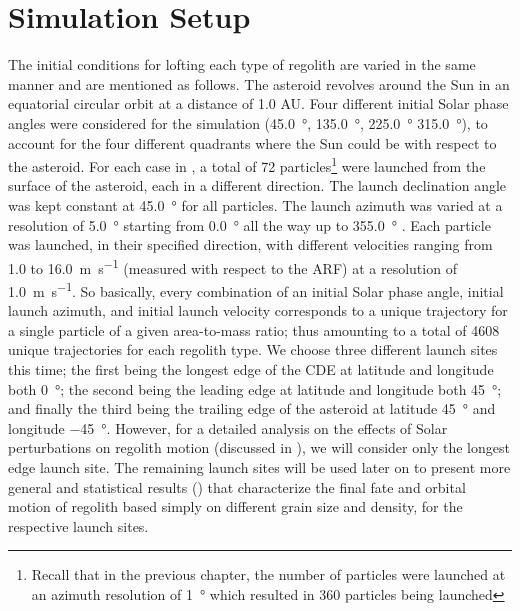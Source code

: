 \section{Simulation Setup}
\label{sec:simulation_setup}
The initial conditions for lofting each type of regolith are varied in the same manner and are mentioned as follows. The asteroid revolves around the Sun in an equatorial circular orbit at a distance of 1.0 AU. Four different initial Solar phase angles were considered for the simulation (\SI{45.0}{\degree}, \SI{135.0}{\degree}, \SI{225.0}{\degree} \SI{315.0}{\degree}), to account for the four different quadrants where the Sun could be with respect to the asteroid.
%
\newline\newline
%
For each case in , a total of 72 particles\footnote{Recall that in the previous chapter, the number of particles were launched at an azimuth resolution of \SI{1}{\degree} which resulted in 360 particles being launched} were launched from the surface of the asteroid, each in a different direction. The launch declination angle was kept constant at \SI{45.0}{\degree}  for all particles. The launch azimuth was varied at a resolution of \SI{5.0}{\degree}  starting from \SI{0.0}{\degree}  all the way up to \SI{355.0}{\degree} . Each particle was launched, in their specified direction, with different velocities ranging from 1.0 to \SI{16.0}{\metre\per\second} (measured with respect to the \gls{ARF}) at a resolution of \SI{1.0}{\metre\per\second}. So basically, every combination of an initial Solar phase angle, initial launch azimuth, and initial launch velocity corresponds to a unique trajectory for a single particle of a given area-to-mass ratio; thus amounting to a total of 4608 unique trajectories for each regolith type.
%
\newline\newline
%
We choose three different launch sites this time; the first being the longest edge of the \gls{CDE} at latitude and longitude both \SI{0}{\degree}; the second being the leading edge at latitude and longitude both \SI{45}{\degree}; and finally the third being the trailing edge of the asteroid at latitude \SI{45}{\degree} and longitude \SI{-45}{\degree}. However, for a detailed analysis on the effects of Solar perturbations on regolith motion (discussed in ), we will consider only the longest edge launch site. The remaining launch sites will be used later on to present more general and statistical results () that characterize the final fate and orbital motion of regolith based simply on different grain size and density, for the respective launch sites.

